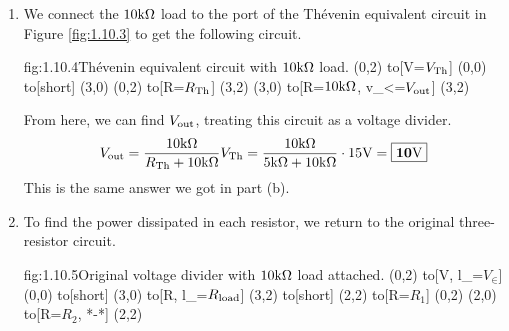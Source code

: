 \documentclass{article}
\begin{document}
\begin{enumerate}
        In this circuit, no current flows through $R_2$, flowing through the short instead. Thus we have $I_{SC} = \dfrac{V_\in }{R_1}$. From this, we can find $R_\Th$ from $R_\Th = \dfrac{V_\Th}{I_{SC}}$. This gives us 
        \[R_\Th = \frac{V_\Th}{I_{SC}} = \frac{V_\Th}{V_\in/R_1} = \frac{15\V}{30\V/10\k\Ohm} = \mans{5\k\Ohm}\]

        The Th\'evenin equivalent circuit takes the form shown below.
        \begin{circuit}{fig:1.10.3}{Th\'evenin equivalent circuit.}
            (0,2) to[V=$V_{\Th}$] (0,0)
            to[short, -o] (3,0)
            (0,2) to[R=$R_{\Th}$, -o] (3,2)
            (3,0) to[open, v_<=$V_\out$] (3,2)
        \end{circuit}
        In terms of behavior at the ports, this circuit is equivalent to the circuit in Figure \ref{fig:1.10.1}. 

        \item 
        We connect the $10\text{k}\Omega$ load to the port of the Th\'evenin equivalent circuit in Figure \ref{fig:1.10.3} to get the following circuit.
        \begin{circuit}{fig:1.10.4}{Th\'evenin equivalent circuit with $10\text{k}\Omega$ load.}
            (0,2) to[V=$V_{\Th}$] (0,0)
            to[short] (3,0)
            (0,2) to[R=$R_{\Th}$] (3,2)
            (3,0) to[R=$10\text{k}\Omega$, v_<=$V_\out$] (3,2)
        \end{circuit}
        From here, we can find $V_\out$, treating this circuit as a voltage divider.
        \[V_{\text{out}} = \frac{10\text{k}\Omega}{R_{\text{Th}} + 10\text{k}\Omega} V_{\text{Th}} = \frac{10\text{k}\Omega}{5\text{k}\Omega + 10\text{k}\Omega} \cdot 15\text{V} = \boxed{\mathbf{10\text{V}}}\] 
        This is the same answer we got in part (b).

        \item 
        To find the power dissipated in each resistor, we return to the original three-resistor circuit. 
        \begin{circuit}{fig:1.10.5}{Original voltage divider with $10\text{k}\Omega$ load attached.}
            (0,2) to[V, l_=$V_\in$] (0,0)
                to[short] (3,0)
                to[R, l_=$R_{\text{load}}$] (3,2)
                to[short] (2,2)
                to[R=$R_1$] (0,2)
            (2,0) to[R=$R_2$, *-*] (2,2)
        \end{circuit}


\end{enumerate}
\end{document}
